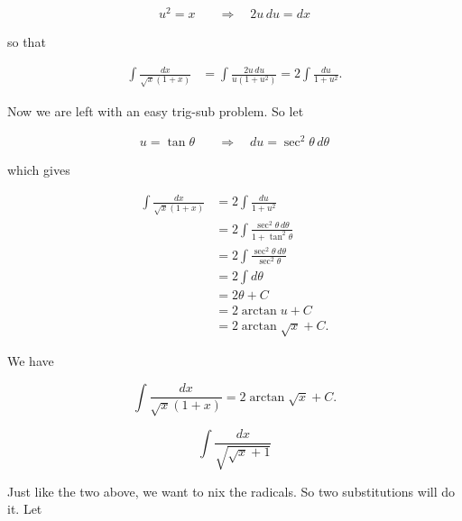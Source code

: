 \documentclass[12pt, letterpaper]{article}
\begin{document}
\begin{equation*}
\begin{aligned}
u^2 = x  \quad &\Rightarrow \quad 2u \, du = dx
\end{aligned}
\end{equation*}

so that

\begin{equation*}
\begin{aligned}
\int \frac{dx}{\sqrt{x} (1 + x)}
  &= \int \frac{2u \, du}{u (1 + u^2)} = 2 \int \frac{du}{1 + u^2}.
\end{aligned}
\end{equation*}

Now we are left with an easy trig-sub problem. So let

\begin{equation*}
\begin{aligned}
u = \tan{\theta}  \quad &\Rightarrow \quad du = \sec^2{\theta}\, d\theta
\end{aligned}
\end{equation*}

which gives

\begin{equation*}
\begin{aligned}
\int \frac{dx}{\sqrt{x} (1 + x)}
  &= 2 \int \frac{du}{1 + u^2} \\[0.2in]
  &= 2 \int \frac{\sec^2{\theta}\, d\theta}{1 + \tan^2{\theta}} \\[0.2in]
  &= 2 \int \frac{\sec^2{\theta}\, d\theta}{\sec^2{\theta}} \\[0.2in]
  &= 2 \int d\theta \\[0.2in]
  &= 2 \theta + C \\[0.2in]
  &= 2 \arctan{u} + C \\[0.2in]
  &= 2 \arctan{\sqrt{x}} + C.
\end{aligned}
\end{equation*}

We have

\begin{equation*}
\boxed
{
\int \frac{dx}{\sqrt{x} (1 + x)}
  = 2 \arctan{\sqrt{x}} + C.
}
\end{equation*}


\newpage

$$ \int \frac{dx}{\sqrt{\sqrt{x} + 1}} $$

Just like the two above, we want to nix the radicals. So two substitutions will do it. Let
\end{document}
